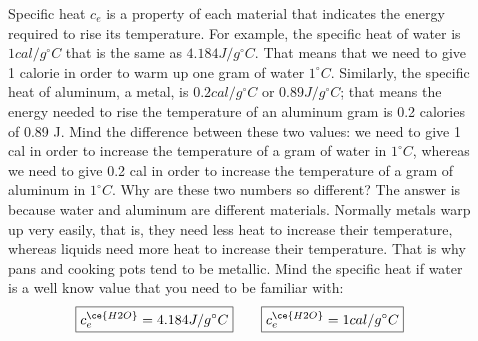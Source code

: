 \documentclass[main.tex]{subfiles}
\begin{document}
\begin{description}
\item[] 
Specific heat $c_e$ is a property of each material that indicates the energy required to rise its temperature. For example, the specific heat of water is $1 cal/g^{\circ}C$ that is the same as $4.184 J/g^{\circ}C$. That means that we need to give 1 calorie in order to warm up one gram of water $1^{\circ}C$. Similarly, the specific heat of aluminum, a metal, is $0.2 cal/g^{\circ}C$ or $0.89J/g^{\circ}C$; that means the energy needed to rise the temperature of an aluminum gram is  0.2 calories of 0.89 J. Mind the difference between these two values: we need to give 1 cal in order to increase the temperature of a gram of water in $1^{\circ}C$, whereas we need to give 0.2 cal in order to increase the temperature of a gram of aluminum in $1^{\circ}C$. Why are these two numbers so different? The answer is because water and aluminum are different materials. Normally metals warp up very easily, that is, they need less heat to increase their temperature, whereas liquids need more heat to increase their temperature. That is why pans and cooking pots tend to be metallic. Mind the specific heat if water is a well know value that you need to be familiar with:
\begin{equation}
\boxed{   c_e^{\ce{H2O}} = 4.184 J/g^{\circ}C   }
\qquad
\boxed{     c_e^{\ce{H2O}} = 1 cal/g^{\circ}C   }
\label{formula2:9}
\end{equation}


\end{description}
\end{document}
